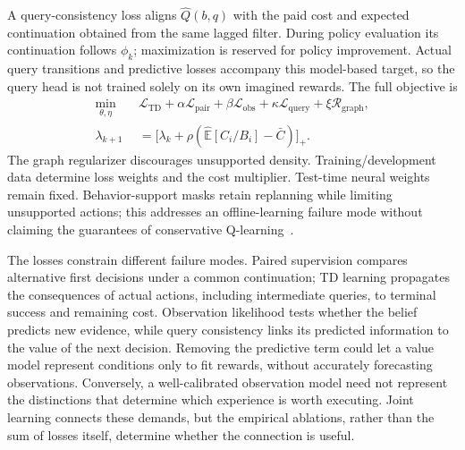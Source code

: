 \documentclass[sigconf,anonymous,review]{acmart}
\newcommand{\E}{\mathbb{E}}
\theoremstyle{zhplain}
\begin{document}
A query-consistency loss aligns \(\hat Q(b,q)\) with the paid cost and expected continuation obtained from the same lagged filter. During policy evaluation its continuation follows \(\phi_k\); maximization is reserved for policy improvement. Actual query transitions and predictive losses accompany this model-based target, so the query head is not trained solely on its own imagined rewards. The full objective is
\begin{equation}
\begin{aligned}
\min_{\theta,\eta}\quad &\mathcal L_{\mathrm{TD}}+\alpha\mathcal L_{\mathrm{pair}}+
\beta\mathcal L_{\mathrm{obs}}+\kappa\mathcal L_{\mathrm{query}}+\xi\mathcal R_{\mathrm{graph}},\\
\lambda_{k+1}&=\big[\lambda_k+\rho(\widehat{\E}[C_i/B_i]-\bar C)\big]_+.
\end{aligned}
\label{eq:joint}
\end{equation}
The graph regularizer discourages unsupported density. Training/development data determine loss weights and the cost multiplier. Test-time neural weights remain fixed. Behavior-support masks retain replanning while limiting unsupported actions; this addresses an offline-learning failure mode without claiming the guarantees of conservative Q-learning~\cite{cql}.

The losses constrain different failure modes. Paired supervision compares alternative first decisions under a common continuation; TD learning propagates the consequences of actual actions, including intermediate queries, to terminal success and remaining cost. Observation likelihood tests whether the belief predicts new evidence, while query consistency links its predicted information to the value of the next decision. Removing the predictive term could let a value model represent conditions only to fit rewards, without accurately forecasting observations. Conversely, a well-calibrated observation model need not represent the distinctions that determine which experience is worth executing. Joint learning connects these demands, but the empirical ablations, rather than the sum of losses itself, determine whether the connection is useful.
\end{document}
